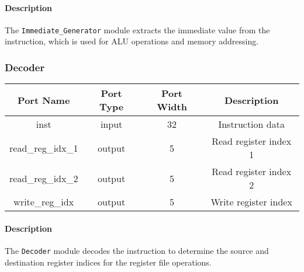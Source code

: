 \documentclass[a4paper,12pt]{article}
\begin{document}
\paragraph{Description}
The \texttt{Immediate\_Generator} module extracts the immediate value from the instruction, which is used for ALU operations and memory addressing.

\subsubsection{Decoder}
\begin{center}
    \begin{tabular}{cccc}
        \toprule
        \textbf{Port Name} & \textbf{Port Type} & \textbf{Port Width} & \textbf{Description} \\
        \midrule
        inst                & input  & 32 & Instruction data \\
        read\_reg\_idx\_1   & output & 5  & Read register index 1 \\
        read\_reg\_idx\_2   & output & 5  & Read register index 2 \\
        write\_reg\_idx     & output & 5  & Write register index \\
        \bottomrule
    \end{tabular}
\end{center}

\paragraph{Description}
The \texttt{Decoder} module decodes the instruction to determine the source and destination register indices for the register file operations.
\end{document}
